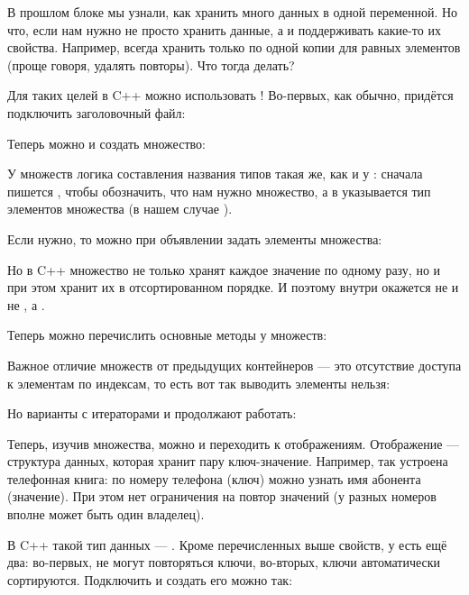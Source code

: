 В прошлом блоке мы узнали, как хранить много данных в одной переменной. Но что, если нам нужно не просто хранить данные, а и поддерживать какие-то их свойства. Например, всегда хранить только по одной копии для равных элементов (проще говоря, удалять повторы). Что тогда делать?

Для таких целей в C++ можно использовать ! Во-первых, как обычно, придётся подключить заголовочный файл:


Теперь можно и создать множество:


У множеств логика составления названия типов такая же, как и у : сначала пишется , чтобы обозначить, что нам нужно множество, а в \lcpp{<>} указывается тип элементов множества (в нашем случае ).

Если нужно, то можно при объявлении задать элементы множества:


Но в C++ множество не только хранят каждое значение по одному разу, но и при этом хранит их в отсортированном порядке. И поэтому внутри  окажется не  и не , а .

Теперь можно перечислить основные методы у множеств:


Важное отличие множеств от предыдущих контейнеров — это отсутствие доступа к элементам по индексам, то есть вот так выводить элементы нельзя:


Но варианты с итераторами и  продолжают работать:


Теперь, изучив множества, можно и переходить к отображениям. Отображение — структура данных, которая хранит пару ключ-значение. Например, так устроена телефонная книга: по номеру телефона (ключ) можно узнать имя абонента (значение). При этом нет ограничения на повтор значений (у разных номеров вполне может быть один владелец).

В C++ такой тип данных — . Кроме перечисленных выше свойств, у  есть ещё два: во-первых, не могут повторяться ключи, во-вторых, ключи автоматически сортируются. Подключить и создать его можно так:


